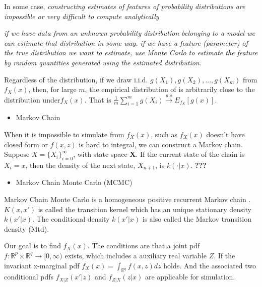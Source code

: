 \documentclass[12pt]{article}
\providecommand{\tightlist}{%
  \setlength{\itemsep}{0pt}\setlength{\parskip}{0pt}}
\begin{document}
In some case, \emph{constructing estimates of features of probability
distributions are impossible or very difficult to compute analytically}

\emph{if we have data from an unknown probability distribution belonging
to a model we can estimate that distribution in some way.} \emph{if we
have a feature (parameter) of the true distribution we want to estimate,
use Monte Carlo to estimate the feature by random quantities generated
using the estimated distribution. }
\citep[ch.~10.1]{doksumMathematicalStatisticsBasic2015}

Regardless of the distribution, if we draw i.i.d.
\(g(X_{1}),g(X_{2}),\ldots,g(X_{m})\) from \(f_{X}(x)\), then, for large
\(m\), the empirical distribution of is arbitrarily close to the
distribution under\(f_{X}(x)\). That is
\(\frac{1}{m}\sum_{i=1}^{m} g(X_{i})\overset{a.s}{\to}E_{f_{X}}[g(x)]\).

\begin{itemize}
\tightlist
\item
  Markov Chain
\end{itemize}

When it is impossible to simulate from \(f_{X}(x)\), such as
\(f_{X}(x)\) doesn't have closed form or \(f(x,z)\) is hard to integral,
we can construct a Markov chain. Suppose
\(X = \{X_{i}\}^{\infty}_{i=0}\), with state space \(\mathbf{X}\). If
the current state of the chain is \(X_{i} = x\), then the density of the
next state, \(X_{n+1}\), is \(k(\cdot|x)\). \textbf{???}

\begin{itemize}
\tightlist
\item
  Markov Chain Monte Carlo (MCMC)
\end{itemize}

Markov Chain Monte Carlo is a homogeneous positive recurrent Markov
chain
\citep{tannerCalculationPosteriorDistributions1987, swendsenNonuniversalCriticalDynamics1987a}.
\(K(x,x')\) is called the transition kernel which has an unique
stationary density \(k(x'|x)\). The conditional density \(k(x'|x)\) is
also called the Markov transition density (Mtd).

Our goal is to find \(f_{X}(x)\). The conditions are that a joint pdf
\(f:\mathbb{R}^p\times\mathbb{R}^q \to [0,\infty)\) exists, which
includes a auxiliary real variable \(Z\). If the invariant x-marginal
pdf \(f_{X}(x)=\int_{\mathbb{R}^q} f(x,z)dz\) holds. And the associated
two conditional pdfs \(f_{X|Z}(x'|z)\) and \(f_{Z|X}(z|x)\) are
applicable for simulation.
\end{document}
